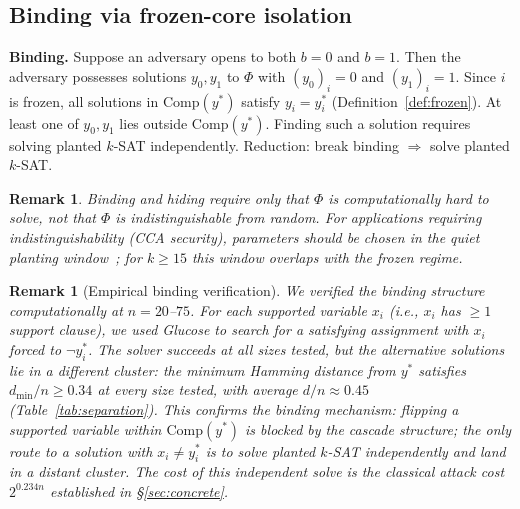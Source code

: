 \documentclass[11pt]{article}
\newtheorem{remark}[theorem]{Remark}
\begin{document}
\subsection{Binding via frozen-core isolation}\label{sec:binding-empirical}

\noindent\textbf{Binding.}  Suppose an adversary opens to both $b = 0$ and $b = 1$.  Then the adversary possesses solutions $y_0, y_1$ to $\Phi$ with $(y_0)_i = 0$ and $(y_1)_i = 1$.  Since $i$ is frozen, all solutions in $\mathrm{Comp}(y^*)$ satisfy $y_i = y^*_i$ (Definition~\ref{def:frozen}).  At least one of $y_0, y_1$ lies outside $\mathrm{Comp}(y^*)$.  Finding such a solution requires solving planted $k$-SAT independently.  Reduction: break binding $\Rightarrow$ solve planted $k$-SAT.

\begin{remark}
Binding and hiding require only that $\Phi$ is computationally hard to solve, not that $\Phi$ is indistinguishable from random.  For applications requiring indistinguishability (CCA security), parameters should be chosen in the quiet planting window~\cite{ACO08}; for $k \geq 15$ this window overlaps with the frozen regime.
\end{remark}

\begin{remark}[Empirical binding verification]\label{rem:binding-empirical}
We verified the binding structure computationally at $n = 20$--$75$.  For each supported variable $x_i$ (i.e., $x_i$ has $\geq 1$ support clause), we used Glucose to search for a satisfying assignment with $x_i$ forced to $\neg y^*_i$.  The solver succeeds at all sizes tested, but the alternative solutions lie in a \emph{different cluster}: the minimum Hamming distance from $y^*$ satisfies $d_{\min}/n \geq 0.34$ at every size tested, with average $d/n \approx 0.45$ (Table~\ref{tab:separation}).  This confirms the binding mechanism: flipping a supported variable within $\mathrm{Comp}(y^*)$ is blocked by the cascade structure; the only route to a solution with $x_i \neq y^*_i$ is to solve planted $k$-SAT independently and land in a distant cluster.  The cost of this independent solve is the classical attack cost $2^{0.234n}$ established in \S\ref{sec:concrete}.
\end{remark}
\end{document}
